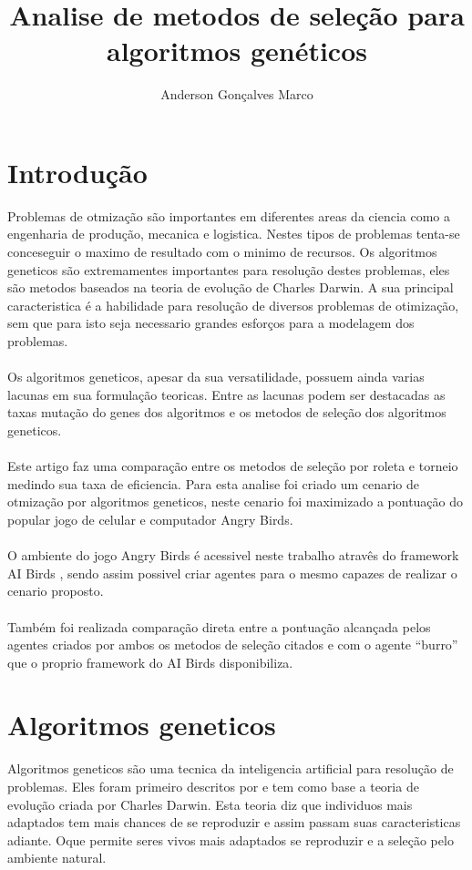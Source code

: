 \documentclass[10pt,a4paper]{article}
\title{Analise de metodos de seleção para algoritmos genéticos}
\author{Anderson Gonçalves Marco}
\begin{document}

\maketitle
\section{Introdução}
Problemas de otmização são importantes em diferentes areas da ciencia como a engenharia de produção, mecanica e logistica. Nestes tipos de problemas tenta-se conceseguir o maximo de resultado com o minimo de recursos. Os algoritmos geneticos são extremamentes importantes para  resolução destes problemas, eles são metodos baseados na teoria de evolução de Charles Darwin. A sua principal caracteristica é a habilidade para resolução de diversos problemas de otimização, sem que para isto seja necessario grandes esforços para a modelagem dos problemas.\\ \\

Os algoritmos geneticos, apesar da sua versatilidade, possuem ainda varias lacunas em sua formulação teoricas. Entre as lacunas podem ser destacadas as taxas mutação do genes dos algoritmos e os metodos de seleção dos algoritmos geneticos.\\ \\

Este artigo faz uma comparação entre os metodos de seleção por roleta e torneio medindo sua taxa de eficiencia. Para esta analise foi criado um cenario de otmização por algoritmos geneticos, neste cenario foi maximizado a pontuação do popular jogo de celular e computador Angry Birds. \\ \\
O ambiente do jogo Angry Birds é acessivel neste trabalho atravês do framework AI Birds \cite{aiBirds}, sendo assim possivel criar agentes para o mesmo capazes de realizar o cenario proposto. \\ \\ 

Também foi realizada comparação direta entre a pontuação alcançada pelos agentes criados por ambos os metodos de seleção citados e com o agente ``burro'' que o proprio framework do AI Birds disponibiliza.

\section{Algoritmos geneticos}
Algoritmos geneticos são uma tecnica da inteligencia artificial para resolução de problemas. Eles foram primeiro descritos por \cite{primeiroAUsarAG} e tem como  base a teoria de evolução criada por Charles Darwin. Esta teoria diz que individuos mais adaptados tem mais chances de se reproduzir e assim passam suas caracteristicas adiante. Oque permite seres vivos mais adaptados se reproduzir e a seleção pelo ambiente natural.\\ \\
\end{document}
